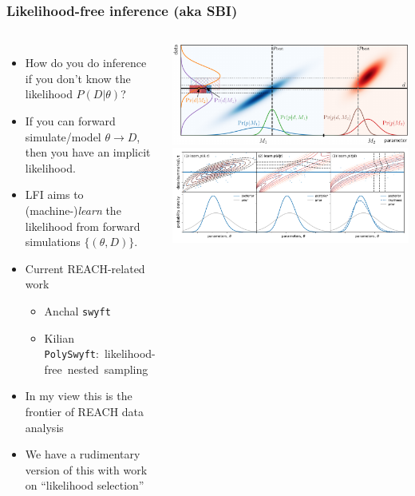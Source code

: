 \documentclass[aspectratio=169]{beamer}
\begin{document}
\begin{frame}
    \frametitle{Likelihood-free inference (aka SBI)}
    \vspace{10pt}
    \begin{columns}
        \vspace{-10pt}
        \begin{itemize}
            \item How do you do inference if you don't know the likelihood $P(D|\theta)$?
            \item If you can forward simulate/model $\theta\to D$, then you have an implicit likelihood.
            \item LFI aims to (machine-)\emph{learn} the likelihood from forward simulations $\{(\theta,D)\}$.
            \item Current REACH-related work
                \begin{itemize}
                    \item Anchal \texttt{swyft}
                    \item Kilian {\footnotesize \texttt{PolySwyft}:~likelihood-free~nested~sampling}
                \end{itemize}
            \item In my view this is the frontier of REACH data analysis
            \item We have a rudimentary version of this with work on ``likelihood selection''~
        \end{itemize}
        \includegraphics[width=\textwidth]{figures/noisy.pdf}
        \includegraphics[width=\textwidth]{figures/three_ways_II.pdf}
    \end{columns}
\end{frame}
\end{document}
